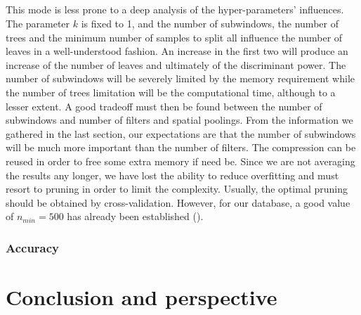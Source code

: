 \documentclass[a4paper]{report}
\begin{document}
	\paragraph{}
	This mode is less prone to a deep analysis of the hyper-parameters' influences. The parameter $k$ is fixed to 1, and the number of subwindows, the number of trees and the minimum number of samples to split all influence the number of leaves in a well-understood fashion. An increase in the first two will produce an increase of the number of leaves and ultimately of the discriminant power. The number of subwindows will be severely limited by the memory requirement while the number of trees limitation will be the computational time, although to a lesser extent. A good tradeoff must then be found between the number of subwindows and number of filters and spatial poolings. From the information we gathered in the last section, our expectations are that the number of subwindows will be much more important than the number of filters. The compression can be reused in order to free some extra memory if need be.
	Since we are not averaging the results any longer, we have lost the ability to reduce overfitting and must resort to pruning in order to limit the complexity. Usually, the optimal pruning should be obtained by cross-validation. However, for our database, a good value of $n_{min} = 500$ has already been established (\cite{base}). 
	\subsection{Accuracy}
	
	
\chapter{Conclusion and perspective}

 


  
\end{document}
